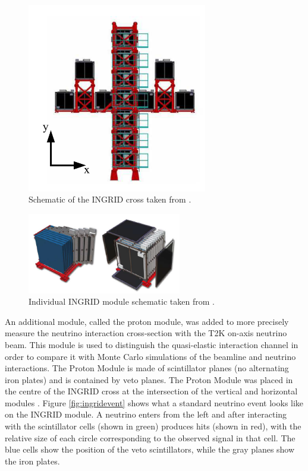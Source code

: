 \begin{figure}
    \centering
    \includegraphics[width=0.7\textwidth]{Figures/ingridcross.png}
    \caption{Schematic of the INGRID cross taken from \cite{t2k_collaboration_t2k_2013}.}
    \label{fig:ingridcross}
\end{figure}
\begin{figure}
    \centering
    \includegraphics[width=0.6\textwidth]{Figures/ingridmodule.png}
    \caption{Individual INGRID module schematic taken from \cite{t2k_collaboration_t2k_2013}.}
    \label{fig:ingridmodule}
\end{figure}

An additional module, called the proton module, was added to more precisely measure the neutrino interaction cross-section with the T2K on-axis neutrino beam. This module is used to distinguish the quasi-elastic interaction channel in order to compare it with Monte Carlo simulations of the beamline and neutrino interactions. The Proton Module is made of scintillator planes (no alternating iron plates) and is contained by veto planes. The Proton Module was placed in the centre of the INGRID cross at the intersection of the vertical and horizontal modules \cite{kikawa2012development}. Figure \ref{fig:ingridevent} shows what a standard neutrino event looks like on the INGRID module. A neutrino enters from the left and after interacting with the scintillator cells (shown in green) produces hits (shown in red), with the relative size of each circle corresponding to the observed signal in that cell. The blue cells show the position of the veto scintillators, while the gray planes show the iron plates.   


